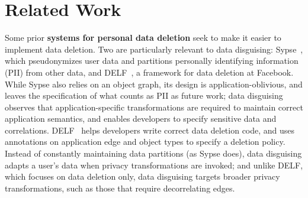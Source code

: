 \section{Related Work}
\label{sec:related}

%
Some prior \textbf{systems for personal data deletion} seek to make it easier to implement data
deletion.
%
Two are particularly relevant to data disguising: Sypse~\cite{sypse}, which pseudonymizes user
data and partitions personally identifying information (PII) from other data, and
DELF~\cite{delf}, a framework for data deletion at Facebook.
%
While Sypse also relies on an object graph, its design is application-oblivious, and leaves the
specification of what counts as PII as future work; data disguising observes that application-specific
transformations are required to maintain correct application semantics, and enables developers to
specify sensitive data and correlations.
%
%
DELF~\cite{delf} helps developers write correct data deletion code, and uses annotations on
application edge and object types to specify a deletion policy.
%
Instead of constantly maintaining data partitions (as Sypse does), data disguising adapts a user's
data when privacy transformations are invoked; and unlike DELF, which focuses on data deletion
only, data disguising targets broader privacy transformations, such as those that require \eg
decorrelating edges.
%

